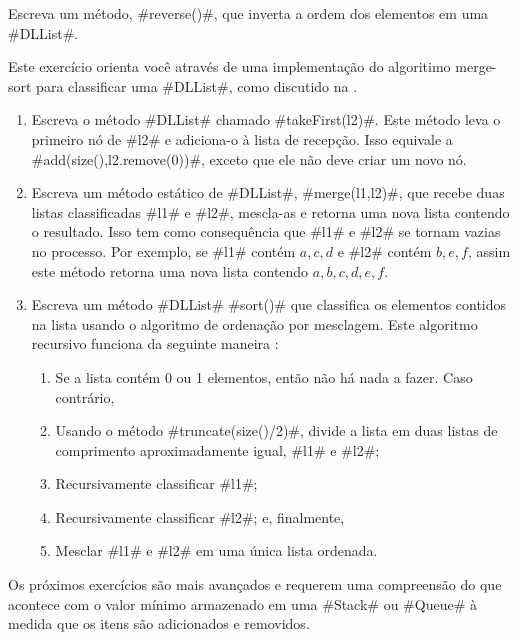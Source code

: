 \begin{exc}
	Escreva um método, #reverse()#, que inverta a ordem dos elementos em
	uma #DLList#.  
\end{exc}

\begin{exc}
	Este exercício orienta você através de uma implementação do algoritimo
	merge-sort para classificar uma #DLList#, como discutido na .
	\begin{enumerate}
		\item Escreva o método #DLList# chamado #takeFirst(l2)#.
		Este método leva o primeiro nó de #l2# e adiciona-o à
		lista de recepção.  Isso equivale a #add(size(),l2.remove(0))#,
		exceto que ele não deve criar um novo nó.
		\item Escreva um método estático de #DLList#, #merge(l1,l2)#, que recebe duas
		listas classificadas #l1# e #l2#, mescla-as e retorna uma nova
		lista contendo o resultado.  Isso tem como consequência que #l1# e #l2# se tornam vazias
		no processo.  Por exemplo, se #l1# contém $a,c,d$ e #l2# contém
		$b,e,f$, assim este método retorna uma nova lista contendo $a,b,c,d,e,f$.
		\item Escreva um método #DLList#  #sort()# que classifica os elementos
		contidos na lista usando o algoritmo de ordenação por mesclagem.
		Este algoritmo recursivo funciona da seguinte maneira :
		\begin{enumerate}
			\item Se a lista contém 0 ou 1 elementos, então
			não há nada a fazer. Caso contrário,
			\item Usando o método #truncate(size()/2)#, divide a lista
			em duas listas de comprimento aproximadamente igual, #l1# e #l2#;
			\item Recursivamente classificar #l1#;
			\item Recursivamente classificar #l2#; e, finalmente,
			\item  Mesclar #l1# e #l2# em uma única lista ordenada.
		\end{enumerate}
	\end{enumerate}
\end{exc}


Os próximos exercícios são mais avançados e requerem uma
compreensão do que acontece com o valor mínimo armazenado em uma #Stack#
ou #Queue#  à medida que os itens são adicionados e removidos.

